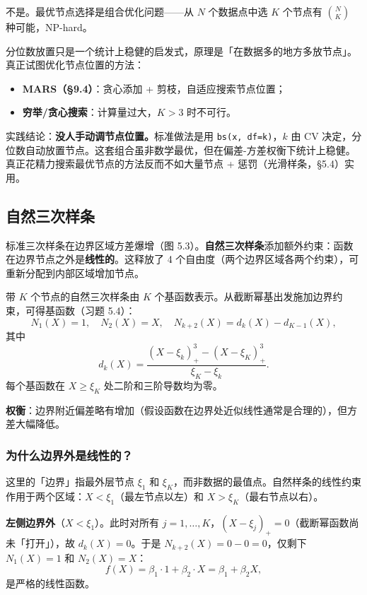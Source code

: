 不是。最优节点选择是组合优化问题——从 $N$ 个数据点中选 $K$ 个节点有 $\binom{N}{K}$ 种可能，NP-hard。

分位数放置只是一个统计上稳健的启发式，原理是「在数据多的地方多放节点」。真正试图优化节点位置的方法：
\begin{itemize}
    \item \textbf{MARS（§9.4）}：贪心添加 + 剪枝，自适应搜索节点位置；
    \item \textbf{穷举/贪心搜索}：计算量过大，$K>3$ 时不可行。
\end{itemize}

实践结论：\textbf{没人手动调节点位置。}标准做法是用 \texttt{bs(x, df=k)}，$k$ 由 CV 决定，分位数自动放置节点。这套组合虽非数学最优，但在偏差-方差权衡下统计上稳健。真正花精力搜索最优节点的方法反而不如大量节点 + 惩罚（光滑样条，§5.4）实用。

\subsection{自然三次样条}

标准三次样条在边界区域方差爆增（图 5.3）。\textbf{自然三次样条}添加额外约束：函数在边界节点之外是\textbf{线性的}。这释放了 4 个自由度（两个边界区域各两个约束），可重新分配到内部区域增加节点。

带 $K$ 个节点的自然三次样条由 $K$ 个基函数表示。从截断幂基出发施加边界约束，可得基函数（习题 5.4）：
\begin{equation}\label{eq:natural_spline_basis}
    N_1(X) = 1,\quad N_2(X) = X,\quad N_{k+2}(X) = d_k(X) - d_{K-1}(X),
\end{equation}
其中
\[
d_k(X) = \frac{(X - \xi_k)_+^3 - (X - \xi_K)_+^3}{\xi_K - \xi_k}.
\]
每个基函数在 $X \ge \xi_K$ 处二阶和三阶导数均为零。

\textbf{权衡}：边界附近偏差略有增加（假设函数在边界处近似线性通常是合理的），但方差大幅降低。

\subsubsection{为什么边界外是线性的？}

这里的「边界」指最外层节点 $\xi_1$ 和 $\xi_K$，而非数据的最值点。自然样条的线性约束作用于两个区域：$X < \xi_1$（最左节点以左）和 $X > \xi_K$（最右节点以右）。

\textbf{左侧边界外}（$X < \xi_1$）。此时对所有 $j=1,\ldots,K$，$(X-\xi_j)_+ = 0$（截断幂函数尚未「打开」），故 $d_k(X) = 0$。于是 $N_{k+2}(X) = 0 - 0 = 0$，仅剩下 $N_1(X)=1$ 和 $N_2(X)=X$：
\[
f(X) = \beta_1 \cdot 1 + \beta_2 \cdot X = \beta_1 + \beta_2 X,
\]
是严格的线性函数。


